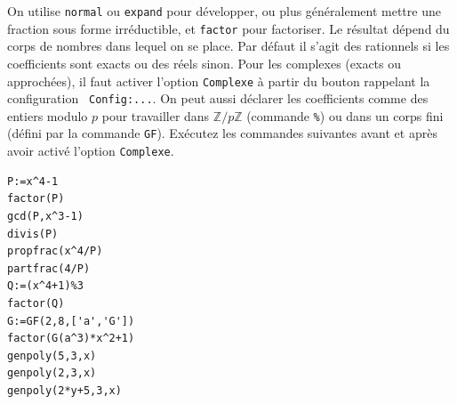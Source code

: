 \documentclass{article}
\newcommand{\Z}{{\mathbb{Z}}}
\begin{document}
On utilise \verb|normal| ou \verb|expand| 
pour d\'evelopper, ou plus g\'en\'eralement mettre une fraction 
sous forme irr\'eductible, et \verb|factor| pour
factoriser. 
Le r\'esultat d\'epend du corps de nombres dans lequel on
se place. Par d\'efaut il s'agit des rationnels si les coefficients
sont exacts ou des r\'eels sinon. Pour les complexes 
(exacts ou approch\'ees), il
faut activer l'option \verb|Complexe| \`a partir du bouton rappelant la configuration \verb| Config:...|. On peut aussi d\'eclarer les 
coefficients comme des
entiers modulo $p$ pour travailler dans $\Z/p\Z$ (commande \verb|%|) 
ou dans un corps
fini (d\'efini par la commande \verb|GF|). Ex\'ecutez les
commandes suivantes avant et apr\`es avoir activ\'e l'option
\verb|Complexe|.
\begin{verbatim}
P:=x^4-1
factor(P)
gcd(P,x^3-1)
divis(P)
propfrac(x^4/P)
partfrac(4/P)
Q:=(x^4+1)%3
factor(Q)
G:=GF(2,8,['a','G'])
factor(G(a^3)*x^2+1)
genpoly(5,3,x)
genpoly(2,3,x)
genpoly(2*y+5,3,x)
\end{verbatim}

  
\end{document}
